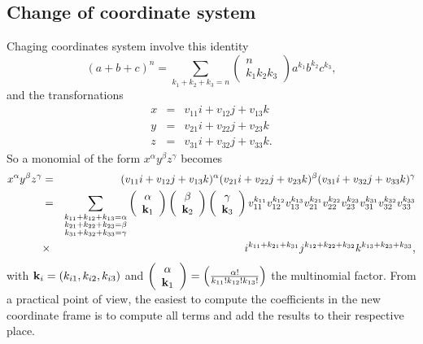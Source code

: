 \documentclass[prb]{revtex4}
\begin{document}
\subsection{Change of coordinate system}
Chaging coordinates system involve this identity
\begin{equation}
  \label{coef:1}
  (a + b + c) ^ n = \sum_{k_1+k_2+k_3 = n} \left(\begin{array}{c} n\\k_1 k_2 k_3\end{array}\right) a^{k_1} b^{k_2} c^{k_3},
\end{equation}
and the transfornations
\begin{eqnarray}
  \label{coef:2}
  x &=& v_{11} i + v_{12} j + v_{13} k\\
  y &=& v_{21} i + v_{22} j + v_{23} k  \label{coef:3}\\
  z &=& v_{31} i + v_{32} j + v_{33} k  \label{coef:4}.
\end{eqnarray}
So a monomial of the form $x^\alpha y ^ \beta z ^\gamma$ becomes
\begin{eqnarray}
  \label{coef:5}
  x^\alpha y ^ \beta z ^\gamma &=& (v_{11} i + v_{12} j + v_{13} k) ^ \alpha (v_{21} i + v_{22} j + v_{23} k) ^ \beta (v_{31} i + v_{32} j + v_{33} k)^\gamma\nonumber\\
  &=& \sum_{\substack{k_{11} + k_{12} + k_{13} = \alpha\\
    k_{21} + k_{22} + k_{23} = \beta\\
    k_{31} + k_{32} + k_{33} = \gamma}} \left(\begin{array}{c}
    \alpha\\ {\bf k}_1
  \end{array}\right)\left(\begin{array}{c}
    \beta\\ {\bf k}_2
  \end{array}\right)\left(\begin{array}{c}
    \gamma\\ {\bf k}_3
  \end{array}\right)v_{11}^{k_{11}}v_{12}^{k_{12}}v_{13}^{k_{13}} v_{21}^{k_{21}}v_{22}^{k_{22}}v_{23}^{k_{23}} v_{31}^{k_{31}}v_{32}^{k_{32}} v_{33}^{k_{33}}\nonumber\\
  &\times& i ^{k_{11}+k_{21}+k_{31}} j ^{k_{12}+k_{22}+k_{32}} k ^{k_{13}+k_{23}+k_{33}},
\end{eqnarray}
with ${\bf k}_i = (k_{i1}, k_{i2}, k_{i3})$ and $\left(\begin{array}{c}
  \alpha\\ {\bf k}_1
\end{array}\right) = \left(\frac{\alpha !}{k_{11} ! k_{12} ! k_{13} !}\right)$ the multinomial factor. From a practical point of view, the easiest to compute the coefficients in the new coordinate frame is to compute all terms and add the results to their respective place.
\end{document}
